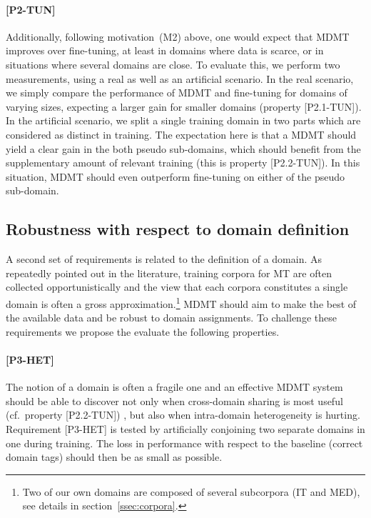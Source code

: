 \documentclass[11pt]{article}
\newcommand{\fyTodo}[1]{\Todo[FY:]{\textcolor{orange}{#1}}}
\newcommand{\jcDone}[1]{\done[JC]\Todo[JC:]{\textcolor{blue}{#1}}}
\begin{document}
\paragraph{[P2-TUN]} Additionally, following motivation~(M2) above, one would expect that MDMT improves over fine-tuning, at least in domains where data is scarce, or in situations where several domains are close. To evaluate this, we perform two measurements, using a real as well as an artificial scenario. In the real scenario, we simply compare the performance of MDMT and fine-tuning for domains of varying sizes, expecting a larger gain for smaller domains (property [P2.1-TUN]). In the artificial scenario, we split a single training domain in two parts which are considered as distinct in training. The expectation here is that a MDMT should yield a clear gain in the both pseudo sub-domains, which should benefit from the supplementary amount of relevant training (this is property [P2.2-TUN]). In this situation, MDMT should even outperform fine-tuning on either of the pseudo sub-domain.
\jcDone{I dont understand the prediction... why running MDMT on 2 artificial subdomains should show  gains over fine-tunning?}\fyTodo{Clearer now ?}

\subsection{Robustness with respect to domain definition \label{ssec:robusness}}
A second set of requirements is related to the definition of a domain. As repeatedly pointed out in the literature, training corpora for MT are often collected opportunistically and the view that each corpora constitutes a single domain is often a gross approximation.\footnote{Two of our own domains are composed of several subcorpora (IT and MED), see details in section~\ref{ssec:corpora}.} MDMT should aim to make the best of the available data and be robust to domain assignments. To challenge these requirements we propose the evaluate the following properties.

\paragraph{[P3-HET]}
The notion of a domain is often a fragile one and an effective MDMT system should be able to discover not only when cross-domain sharing is most useful (cf.\ property [P2.2-TUN]) \jcDone{what is P2.2?}, but also when intra-domain heterogeneity is hurting. Requirement [P3-HET] is tested by artificially conjoining two separate domains in one during training. The loss in performance with respect to the baseline (correct domain tags) should then be as small as possible.
\end{document}
